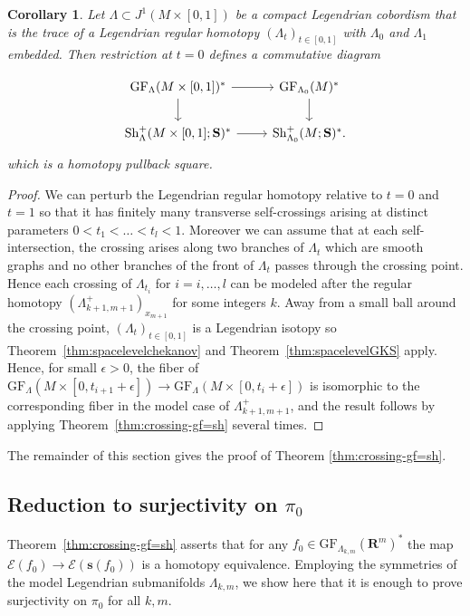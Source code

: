 \documentclass[12pt,a4paper]{article}
\numberwithin{equation}{section}
\newtheorem{cor}[equation]{Corollary}
\theoremstyle{definition}
\theoremstyle{remark}
\newcommand{\E}{\mathcal{E}}
\newcommand{\R}{\mathbf{R}}
\newcommand{\s}{\mathbf{s}}
\newcommand{\Sh}{\mathrm{Sh}}
\renewcommand{\S}{\mathbf{S}}
\newcommand{\GF}{\mathrm{GF}}
\begin{document}
\begin{cor}\label{cor:regularhtpy}
Let $\Lambda\subset J^1(M\times [0,1])$ be a compact Legendrian cobordism that is the trace of a Legendrian regular
homotopy $(\Lambda_t)_{t\in [0,1]}$ with $\Lambda_0$ and $\Lambda_1$ embedded. Then restriction at $t=0$ defines a commutative diagram

\begin{equation}
\begin{tikzcd}
\GF_\Lambda(M\times[0,1])^* \arrow[d]\arrow[r] & \arrow[d] \GF_{\Lambda_0}(M)^* \\
\Sh^+_\Lambda(M\times[0,1];\S)^* \arrow[r] & \Sh^+_{\Lambda_0}(M;\S)^*.
\end{tikzcd}
\end{equation}
which is a homotopy pullback square.
\end{cor}
\begin{proof}
We can perturb the Legendrian regular homotopy relative to $t=0$ and $t=1$ so that it has finitely
many transverse self-crossings arising at distinct parameters $0<t_1<\dots<t_l<1$. Moreover we can assume
that at each self-intersection, the crossing arises along two branches of $\Lambda_t$ which are smooth graphs
and no other branches of the front of $\Lambda_t$ passes through the crossing point. Hence each crossing of $\Lambda_{t_i}$
for $i=i,\dots,l$ can be modeled after the regular homotopy $(\Lambda_{k+1,m+1}^+)_{x_{m+1}}$ for some
integers $k$. Away from a small ball around the crossing point, $(\Lambda_t)_{t\in[0,1]}$ is a Legendrian isotopy so
Theorem~\ref{thm:spacelevelchekanov} and Theorem~\ref{thm:spacelevelGKS} apply. Hence, for small $\epsilon >0$, the fiber of
$\GF_\Lambda(M\times[0,t_{i+1}+\epsilon]) \to \GF_\Lambda(M\times [0,t_{i}+\epsilon])$ is isomorphic to
the corresponding fiber in the model case of $\Lambda_{k+1,m+1}^+$, and the result follows by applying
Theorem~\ref{thm:crossing-gf=sh} several times.
\end{proof}

The remainder of this section gives the proof of Theorem \ref{thm:crossing-gf=sh}.

\subsection{Reduction to surjectivity on $\pi_0$}


Theorem~\ref{thm:crossing-gf=sh} asserts that for any $f_0\in \GF_{\Lambda_{k,m}}(\R^m)^*$
the map $\E(f_0)\to \E(\s(f_0))$ is a homotopy equivalence. Employing the symmetries of the model Legendrian
submanifolds $\Lambda_{k,m}$, we show here that it is enough to prove surjectivity on $\pi_0$ for all $k,m$.
\end{document}
